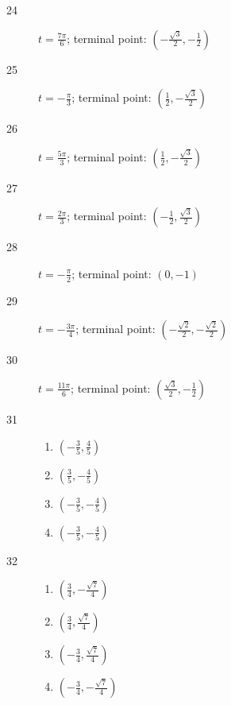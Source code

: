 \documentclass{exam}
\begin{document}
\begin{description}
      \item[24] $t = \frac{7 \pi}{6}$; terminal point: $\boxed{ \left( - \frac{\sqrt{3}}{2}, - \frac{1}{2} \right) }$

      \item[25] $t = -\frac{\pi}{3}$; terminal point: $\boxed{ \left( \frac{1}{2}, - \frac{\sqrt{3}}{2}  \right) }$

      \item[26] $t = \frac{5 \pi}{3}$; terminal point: $\boxed{ \left( \frac{1}{2}, - \frac{\sqrt{3}}{2}  \right) }$

      \item[27] $t = \frac{2 \pi}{3}$; terminal point: $\boxed{ \left( - \frac{1}{2}, \frac{\sqrt{3}}{2}  \right) }$

      \item[28] $t = -\frac{\pi}{2}$; terminal point: $\boxed{ \left( 0, -1 \right) }$

      \item[29] $t = - \frac{3 \pi}{4}$; terminal point: $\boxed{ \left( - \frac{\sqrt{2}}{2}, - \frac{\sqrt{2}}{2}  \right) }$
        
      \item[30] $t = \frac{11 \pi}{6}$; terminal point: $\boxed{ \left( \frac{\sqrt{3}}{2}, - \frac{1}{2}  \right) }$

      \item[31]
        \begin{enumerate}[a]
          \item $\left( - \frac{3}{5}, \frac{4}{5} \right)$
          \item $\left( \frac{3}{5}, - \frac{4}{5} \right)$
          \item $\left( - \frac{3}{5}, - \frac{4}{5} \right)$
          \item $\left( - \frac{3}{5}, - \frac{4}{5} \right)$
        \end{enumerate}

      \item[32]
        \begin{enumerate}[a]
          \item $\left( \frac{3}{4}, - \frac{\sqrt{7}}{4} \right)$
          \item $\left( \frac{3}{4}, \frac{\sqrt{7}}{4} \right)$
          \item $\left( - \frac{3}{4}, \frac{\sqrt{7}}{4} \right)$
          \item $\left( - \frac{3}{4}, - \frac{\sqrt{7}}{4} \right)$
        \end{enumerate}


\end{description}
\end{document}
